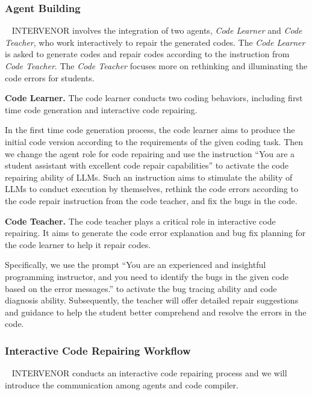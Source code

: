 \documentclass[11pt]{article}
\begin{document}
\subsubsection{Agent Building}~\label{sec:agent}
INTERVENOR involves the integration of two agents, \textit{Code Learner} and \textit{Code Teacher}, who work interactively to repair the generated codes. The \textit{Code Learner} is asked to generate codes and repair codes according to the instruction from \textit{Code Teacher}. The \textit{Code Teacher} focuses more on rethinking and illuminating the code errors for students.

\textbf{Code Learner.} The code learner conducts two coding behaviors, including first time code generation and interactive code repairing.

In the first time code generation process, the code learner aims to produce the initial code version according to the requirements of the given coding task. Then we change the agent role for code repairing and use the instruction ``You are a student assistant with excellent code repair capabilities'' to activate the code repairing ability of LLMs. Such an instruction aims to stimulate the ability of LLMs to conduct execution by themselves, rethink the code errors according to the code repair instruction from the code teacher, and fix the bugs in the code.

\textbf{Code Teacher.} The code teacher plays a critical role in interactive code repairing. It aims to generate the code error explanation and bug fix planning for the code learner to help it repair codes.

Specifically, we use the prompt ``You are an experienced and insightful programming instructor, and you need to identify the bugs in the given code based on the error messages.'' to activate the bug tracing ability and code diagnosis ability. Subsequently, the teacher will offer detailed repair suggestions and guidance to help the student better comprehend and resolve the errors in the code.



\subsubsection{Interactive Code Repairing Workflow}~\label{sec:workflow}
INTERVENOR conducts an interactive code repairing process and we will introduce the communication among agents and code compiler.
\end{document}
